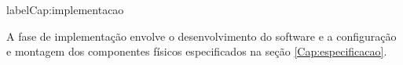 label{Cap:implementacao}

A fase de implementação envolve o desenvolvimento do software e a configuração e montagem dos componentes físicos  especificados na seção \ref{Cap:especificacao}.


